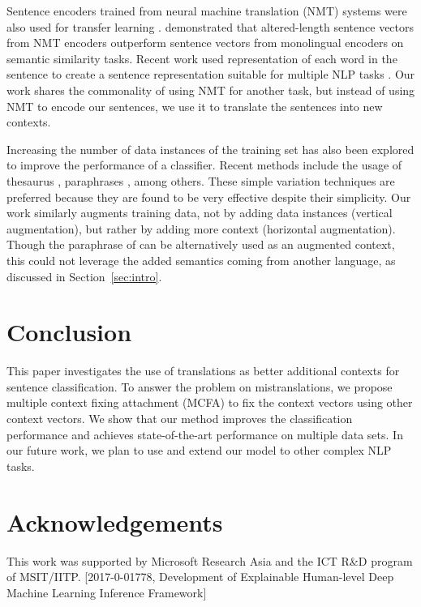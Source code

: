 \documentclass{article}
\begin{document}
Sentence encoders trained from neural machine translation (NMT) systems were also used for transfer learning \cite{hill2016learning}. 
\cite{hill2017representational} 
demonstrated that altered-length sentence vectors from NMT encoders outperform sentence vectors from monolingual encoders on semantic similarity tasks. Recent work used representation of each word in the sentence to create a sentence representation suitable for multiple NLP tasks \cite{mccann2017learned}.
Our work shares the commonality of using NMT for another task, but instead of using NMT to encode our sentences, we 
use it to translate the sentences into new contexts.




Increasing the number of data instances of the training set has also been explored to improve the performance of a classifier. 
Recent methods include the usage of thesaurus \cite{zhang2015character}, paraphrases \cite{fu2014improving}, among others.
These simple variation techniques are preferred because they are found to be very effective despite their simplicity.
Our work similarly augments training data, not by adding data instances (vertical augmentation), but rather by adding more context (horizontal augmentation). Though the paraphrase of  can be alternatively used as an augmented context, this could not leverage the added semantics coming from another language, as discussed in Section~\ref{sec:intro}. 



\section{Conclusion}

This paper investigates the use of translations as better additional contexts for sentence classification. To answer the problem on mistranslations, we propose 
multiple context fixing attachment (MCFA) to fix the context vectors using other context vectors. We show that our method improves the classification performance and achieves state-of-the-art performance on multiple data sets. In our future work, we plan to use and extend our model to other complex NLP tasks.


\section*{Acknowledgements}

This work was supported by Microsoft Research Asia and the ICT R\&D program of MSIT/IITP.
[2017-0-01778, Development of Explainable Human-level Deep Machine Learning Inference Framework]



\end{document}
